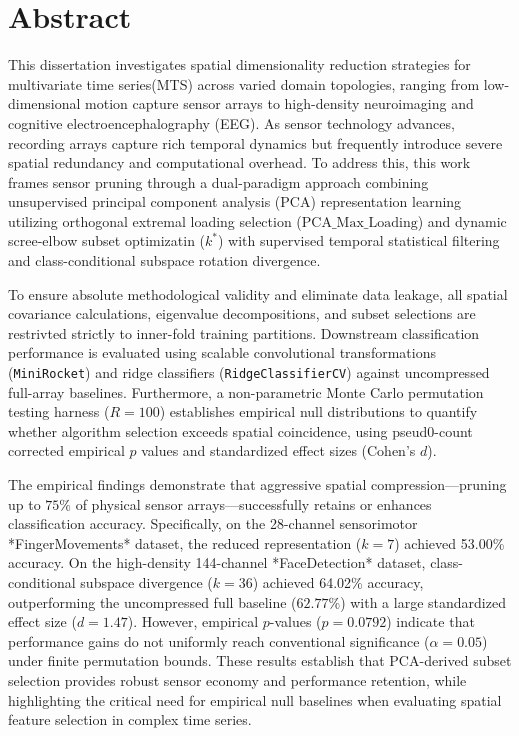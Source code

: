 \documentclass[
  author={Praveen Kumar Vijaya Kumar},
  supervisor={Dr. Zahraa Abdallah},
  degree={MSc},
  title={Dimensionality Reduction for Multivariate Time Series},
  subtitle={Evaluating Unsupervised PCA and Supervised Filtering Paradigms},
  year={2026}
]{dissertation}
\begin{document}
\frontmatter

\maketitle
\makedecl

\chapter*{Abstract}


\noindent
This dissertation investigates spatial dimensionality reduction strategies for multivariate time series(MTS) across varied domain topologies, ranging from low-dimensional motion capture sensor arrays to high-density neuroimaging and cognitive electroencephalography (EEG). As sensor technology advances, recording arrays capture rich temporal dynamics but frequently introduce severe spatial redundancy and computational overhead. To address this, this work frames sensor pruning through a dual-paradigm approach combining unsupervised principal component analysis (PCA) representation learning utilizing orthogonal extremal loading selection ($\text{PCA\_Max\_Loading}$) and dynamic scree-elbow subset optimizatin ($k^*$) with supervised temporal statistical filtering and class-conditional subspace rotation divergence. 


To ensure absolute methodological validity and eliminate data leakage, all spatial covariance calculations, eigenvalue decompositions, and subset selections are restrivted strictly to inner-fold training partitions. Downstream classification performance is evaluated using scalable convolutional transformations (\texttt{MiniRocket}) and ridge classifiers (\texttt{RidgeClassifierCV}) against uncompressed full-array baselines. Furthermore, a non-parametric Monte Carlo permutation testing harness ($R=100$) establishes empirical null distributions to quantify whether algorithm selection exceeds spatial coincidence, using pseud0-count corrected empirical $p$ values and standardized effect sizes (Cohen's $d$).




The empirical findings demonstrate that aggressive spatial compression—pruning up to $75\%$ of physical sensor arrays—successfully retains or enhances classification accuracy. Specifically, on the 28-channel sensorimotor *FingerMovements* dataset, the reduced representation ($k=7$) achieved 53.00\% accuracy. On the high-density 144-channel *FaceDetection* dataset, class-conditional subspace divergence ($k=36$) achieved 64.02\% accuracy, outperforming the uncompressed full baseline ($62.77\%$) with a large standardized effect size ($d = 1.47$). However, empirical $p$-values ($p = 0.0792$) indicate that performance gains do not uniformly reach conventional significance ($\alpha = 0.05$) under finite permutation bounds. These results establish that PCA-derived subset selection provides robust sensor economy and performance retention, while highlighting the critical need for empirical null baselines when evaluating spatial feature selection in complex time series.
\end{document}
